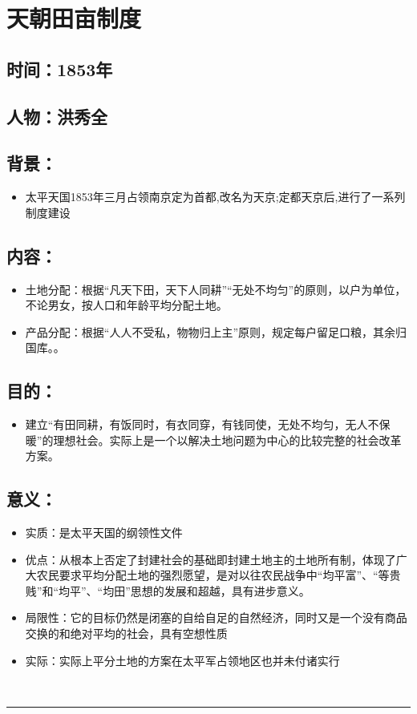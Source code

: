 \documentclass{article}
\begin{document}
\section*{天朝田亩制度}
\subsection*{时间：1853年}
\subsection*{人物：洪秀全}
\subsection*{背景：}
\begin{itemize}
	\item 太平天国1853年三月占领南京定为首都,改名为天京;定都天京后,进行了一系列制度建设
\end{itemize}
\subsection*{内容：}
\begin{itemize}
    \item 土地分配：根据“凡天下田，天下人同耕”“无处不均匀”的原则，以户为单位，不论男女，按人口和年龄平均分配土地。
    \item  产品分配：根据“人人不受私，物物归上主”原则，规定每户留足口粮，其余归国库。。
\end{itemize}
\subsection*{目的：}
\begin{itemize}
	\item 建立“有田同耕，有饭同时，有衣同穿，有钱同使，无处不均匀，无人不保暖”的理想社会。实际上是一个以解决土地问题为中心的比较完整的社会改革方案。
\end{itemize}
\subsection*{意义：}
\begin{itemize}
	\item 实质：是太平天国的纲领性文件
    \item  优点：从根本上否定了封建社会的基础即封建土地主的土地所有制，体现了广大农民要求平均分配土地的强烈愿望，是对以往农民战争中“均平富”、“等贵贱”和“均平”、“均田”思想的发展和超越，具有进步意义。
    \item 局限性：它的目标仍然是闭塞的自给自足的自然经济，同时又是一个没有商品交换的和绝对平均的社会，具有空想性质
    \item 实际：实际上平分土地的方案在太平军占领地区也并未付诸实行
\end{itemize}
\ \hrule
\end{document}
